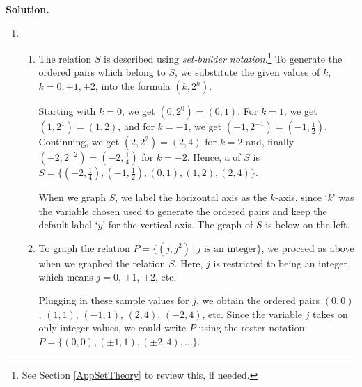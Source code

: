 \begin{ex}
\begin{enumerate}
\begin{multicols}{2}
\begin{enumerate}
\setcounter{HW}{\value{enumii}}
\end{enumerate}
\end{multicols}

\end{enumerate}

{\bf Solution.}  

\begin{enumerate}

\item \begin{enumerate}

\item The relation $S$ is described using  \textit{set-builder notation}.\footnote{See Section \ref{AppSetTheory} to review this, if needed.}  To generate the ordered pairs  which belong to $S$, we substitute the given values of $k$, $k = 0, \pm 1, \pm 2$, into the formula $\left(k, 2^{k}\right)$. 

\smallskip

 Starting with $k=0$, we get $\left(0, 2^{0} \right) = (0,1)$.  For $k = 1$, we get $\left(1, 2^{1} \right) = (1,2)$, and for $k = -1$, we get $\left(-1, 2^{-1} \right) = \left(-1,\frac{1}{2} \right)$.  Continuing, we get  $\left(2, 2^{2} \right) = (2,4)$ for $k = 2$  and, finally $\left(-2, 2^{-2} \right) = \left(-2,\frac{1}{4} \right)$ for $k = -2$.  Hence, a  of $S$ is  $S = \{  \left(-2,\frac{1}{4} \right),  \left(-1,\frac{1}{2} \right),  \left(0,1 \right),  \left(1,2 \right),  \left(2,4 \right)\}$. 
 
 \smallskip
 
  When we graph $S$, we label the horizontal axis as the $k$-axis, since `$k$' was the variable chosen used to generate the ordered pairs and keep the default label `$y$' for the vertical axis. The graph of $S$ is below on the left.

\item  To graph the relation $P = \{ \left(j, j^2\right) \, | \, \text{$j$ is an integer} \}$, we proceed as above when we graphed the relation $S$.  Here, $j$ is restricted to being an integer, which means $j = 0$, $\pm 1$, $\pm 2$, etc.  

\smallskip

Plugging in these sample values for $j$, we obtain the ordered pairs $(0,0)$, $(1, 1)$, $(-1,1)$, $(2,4)$, $(-2,4)$, etc.  Since the variable $j$ takes on only integer values,  we could write $P$ using the roster notation: $P = \{ (0,0), (\pm 1, 1), (\pm 2, 4), \dots \}$.   


\end{enumerate}
\end{enumerate}
\end{ex}
